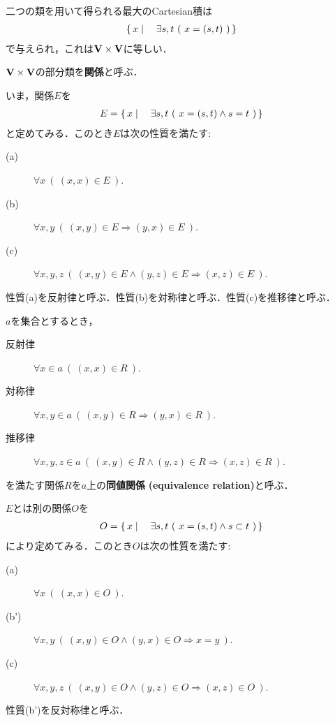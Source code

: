 	二つの類を用いて得られる最大のCartesian積は
	\begin{align}
		\left\{\, x \mid \quad \exists s,t\ (\ x=(s,t)\ )\, \right\}
	\end{align}
	で与えられ，これは$\mathbf{V} \times \mathbf{V}$に等しい．
	
	\begin{screen}
		\begin{dfn}[関係]
			$\mathbf{V} \times \mathbf{V}$の部分類を{\bf 関係}と呼ぶ．
		\end{dfn}
	\end{screen}
	
	いま，関係$E$を
	\begin{align}
		E = \left\{\, x \mid \quad \exists s,t\ (\ x=(s,t) \wedge s = t\ )\, \right\}
	\end{align}
	と定めてみる．このとき$E$は次の性質を満たす:
	\begin{description}
		\item[(a)] $\forall x\ (\ (x,x) \in E\ )$.
		\item[(b)] $\forall x,y\ (\ (x,y) \in E \Longrightarrow (y,x) \in E\ )$.
		\item[(c)] $\forall x,y,z\ (\ (x,y) \in E \wedge (y,z) \in E \Longrightarrow (x,z) \in E\ )$.
	\end{description}
	性質(a)を反射律と呼ぶ．性質(b)を対称律と呼ぶ．性質(c)を推移律と呼ぶ．
	
	\begin{screen}
		\begin{dfn}[同値関係]
			$a$を集合とするとき，
			\begin{description}
				\item[反射律] $\forall x \in a\ (\ (x,x) \in R\ )$.
				\item[対称律] $\forall x,y \in a\ (\ (x,y) \in R \Longrightarrow (y,x) \in R\ )$.
				\item[推移律] $\forall x,y,z \in a\ (\ (x,y) \in R \wedge (y,z) \in R \Longrightarrow (x,z) \in R\ )$.
			\end{description}
			を満たす関係$R$を$a$上の{\bf 同値関係}\index{どうちかんけい@同値関係}
			{\bf (equivalence relation)}と呼ぶ．
		\end{dfn}
	\end{screen}
	
	
	$E$とは別の関係$O$を
	\begin{align}
		O = \left\{\, x \mid \quad \exists s,t\ (\ x=(s,t) \wedge s \subset t\ )\, \right\}
	\end{align}
	により定めてみる．このとき$O$は次の性質を満たす:
	\begin{description}
		\item[(a)] $\forall x\ (\ (x,x) \in O\ )$.
		\item[(b')] $\forall x,y\ (\ (x,y) \in O \wedge (y,x) \in O \Longrightarrow x=y\ )$.
		\item[(c)] $\forall x,y,z\ (\ (x,y) \in O \wedge (y,z) \in O \Longrightarrow (x,z) \in O\ )$.
	\end{description}
	性質(b')を反対称律と呼ぶ．
	

